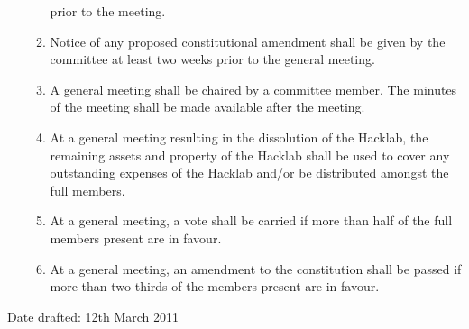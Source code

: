 \documentclass{article}
\begin{document}
\begin{enumerate}
\begin{enumerate}
        prior to the meeting.
      \item Notice of any proposed constitutional amendment shall be
        given by the committee at least two weeks prior to the general
        meeting.
      \item A general meeting shall be chaired by a committee
        member. The minutes of the meeting shall be made available
        after the meeting.
      \item At a general meeting resulting in the dissolution of the
        Hacklab, the remaining assets and property of the Hacklab
        shall be used to cover any outstanding expenses of the Hacklab
        and/or be distributed amongst the full members.
      \item At a general meeting, a vote shall be carried if more than
        half of the full members present are in favour.
      \item At a general meeting, an amendment to the constitution
        shall be passed if more than two thirds of the members present
        are in favour.
      \end{enumerate}
      
\end{enumerate}
\bigskip
\begin{changebar}
Date drafted: 12th March 2011
\end{changebar}
\end{document}
